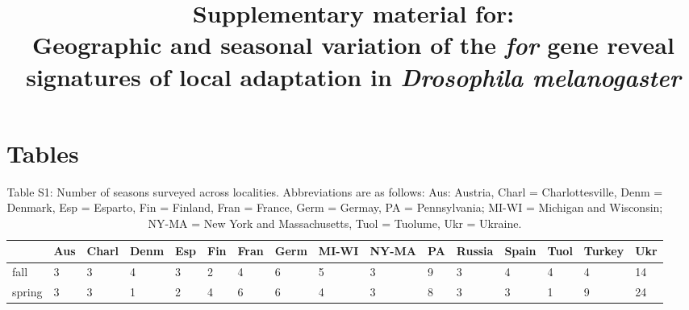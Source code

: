 \documentclass[12pt]{article}
\begin{document}
\title{Supplementary material for: \\
Geographic and seasonal variation of the \textit{for} gene reveal signatures of local adaptation in \textit{Drosophila melanogaster}}
\vspace{25px}
\date{}
\maketitle

\vspace{30px}

\section*{Tables}

\setcounter{table}{0}
\renewcommand{\thetable}{S\arabic{table}}


\begin{table}[ht]
\tiny
\centering
\caption*{\tiny Table S1: Number of seasons surveyed across localities. Abbreviations are as follows: Aus: Austria, Charl = Charlottesville, Denm = Denmark, Esp = Esparto, Fin = Finland, Fran = France, Germ = Germay, PA = Pennsylvania; MI-WI = Michigan and Wisconsin; NY-MA = New York and Massachusetts, Tuol = Tuolume, Ukr = Ukraine.}
\begin{tabular}{llllllllllllllll}
  \hline
 & Aus & Charl & Denm & Esp & Fin & Fran & Germ & MI-WI & NY-MA & PA & Russia & Spain & Tuol & Turkey & Ukr \\ 
  \hline
fall &   3 &   3 &   4 &   3 &   2 &   4 &   6 &   5 &   3 &   9 &   3 &   4 &   4 &   4 &  14 \\ 
  spring &   3 &   3 &   1 &   2 &   4 &   6 &   6 &   4 &   3 &   8 &   3 &   3 &   1 &   9 &  24 \\ 
   \hline
\end{tabular}
\end{table}
\end{document}
